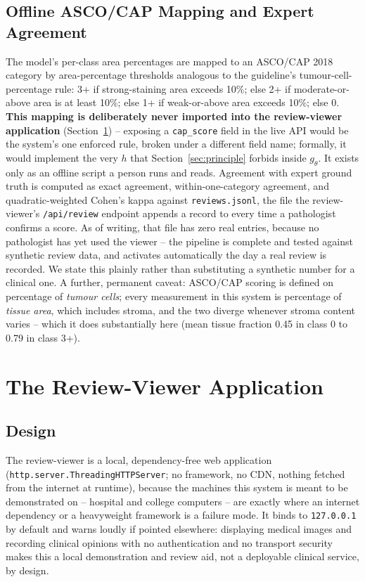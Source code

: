 \documentclass[conference]{IEEEtran}
\begin{document}
\subsection{Offline ASCO/CAP Mapping and Expert Agreement}

The model's per-class area percentages are mapped to an ASCO/CAP 2018
\cite{wolff2018} category by area-percentage thresholds analogous to the
guideline's tumour-cell-percentage rule: 3+ if strong-staining area exceeds
10\%; else 2+ if moderate-or-above area is at least 10\%; else 1+ if
weak-or-above area exceeds 10\%; else 0. \textbf{This mapping is
deliberately never imported into the review-viewer application}
(Section~\ref{sec:app}) -- exposing a \texttt{cap\_score} field in the live
API would be the system's one enforced rule, broken under a different
field name; formally, it would implement the very $h$ that
Section~\ref{sec:principle} forbids inside $g_\theta$. It exists only as
an offline script a person runs and reads. Agreement with expert ground
truth is computed as exact agreement, within-one-category agreement, and
quadratic-weighted Cohen's kappa \cite{cohen1968} against
\texttt{reviews.jsonl}, the file the review-viewer's
\texttt{/api/review} endpoint appends a record to every time a pathologist
confirms a score. As of writing, that file has zero real entries, because
no pathologist has yet used the viewer -- the pipeline is complete and
tested against synthetic review data, and activates automatically the day
a real review is recorded. We state this plainly rather than substituting
a synthetic number for a clinical one. A further, permanent caveat:
ASCO/CAP scoring is defined on percentage of \emph{tumour cells}; every
measurement in this system is percentage of \emph{tissue area}, which
includes stroma, and the two diverge whenever stroma content varies --
which it does substantially here (mean tissue fraction 0.45 in class 0 to
0.79 in class 3+).

\section{The Review-Viewer Application}
\label{sec:app}

\subsection{Design}

The review-viewer is a local, dependency-free web application
(\texttt{http.server.ThreadingHTTPServer}; no framework, no CDN, nothing
fetched from the internet at runtime), because the machines this system is
meant to be demonstrated on -- hospital and college computers -- are
exactly where an internet dependency or a heavyweight framework is a
failure mode. It binds to \texttt{127.0.0.1} by default and warns loudly if
pointed elsewhere: displaying medical images and recording clinical
opinions with no authentication and no transport security makes this a
local demonstration and review aid, not a deployable clinical service, by
design.
\end{document}
